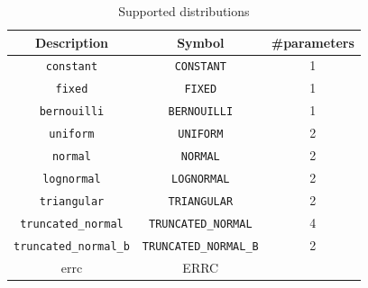 \begin{table}[htbp]
\begin{tabular}{|c|c|c|}
\hline
Description & Symbol & \#parameters \\
\hline
\verb|constant| & \verb|CONSTANT| & 1 \\
\verb|fixed| & \verb|FIXED| & 1 \\
\verb|bernouilli| & \verb|BERNOUILLI| & 1 \\
\verb|uniform| & \verb|UNIFORM| & 2 \\
\verb|normal| & \verb|NORMAL| & 2 \\
\verb|lognormal| & \verb|LOGNORMAL| & 2 \\
\verb|triangular| & \verb|TRIANGULAR| & 2 \\
\verb|truncated_normal| & \verb|TRUNCATED_NORMAL| & 4 \\
\verb|truncated_normal_b| & \verb|TRUNCATED_NORMAL_B| & 2 \\
errc & ERRC \\
\hline
\end{tabular}
\label{tab:moca_distribution}
\caption{Supported distributions}
\end{table}
